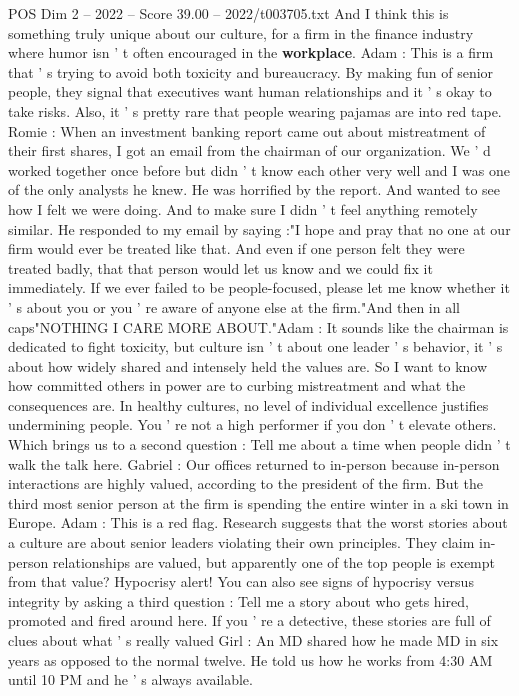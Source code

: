 \begin{textsample}{POS Dim 2 – 2022 – Score 39.00 – 2022/t003705.txt}
And I think this is something truly unique about our culture, for a firm in the finance industry where humor isn ' t often encouraged in the \textbf{workplace}.
Adam : This is a firm that ' s trying to avoid both toxicity and bureaucracy.
By making fun of senior people, they signal that executives want human relationships and it ' s okay to take risks.
Also, it ' s pretty rare that people wearing pajamas are into red tape.
Romie : When an investment banking report came out about mistreatment of their first shares, I got an email from the chairman of our organization.
We ' d worked together once before but didn ' t know each other very well and I was one of the only analysts he knew.
He was horrified by the report.
And wanted to see how I felt we were doing.
And to make sure I didn ' t feel anything remotely similar.
He responded to my email by saying :"I hope and pray that no one at our firm would ever be treated like that.
And even if one person felt they were treated badly, that that person would let us know and we could fix it immediately.
If we ever failed to be people-focused, please let me know whether it ' s about you or you ' re aware of anyone else at the firm."And then in all caps"NOTHING I CARE MORE ABOUT."Adam : It sounds like the chairman is dedicated to fight toxicity, but culture isn ' t about one leader ' s behavior, it ' s about how widely shared and intensely held the values are.
So I want to know how committed others in power are to curbing mistreatment and what the consequences are.
In healthy cultures, no level of individual excellence justifies undermining people.
You ' re not a high performer if you don ' t elevate others.
Which brings us to a second question : Tell me about a time when people didn ' t walk the talk here.
Gabriel : Our offices returned to in-person because in-person interactions are highly valued, according to the president of the firm.
But the third most senior person at the firm is spending the entire winter in a ski town in Europe.
Adam : This is a red flag.
Research suggests that the worst stories about a culture are about senior leaders violating their own principles.
They claim in-person relationships are valued, but apparently one of the top people is exempt from that value?
Hypocrisy alert!
You can also see signs of hypocrisy versus integrity by asking a third question : Tell me a story about who gets hired, promoted and fired around here.
If you ' re a detective, these stories are full of clues about what ' s really valued Girl : An MD shared how he made MD in six years as opposed to the normal twelve.
He told us how he works from 4:30 AM until 10 PM and he ' s always available.

\end{textsample}
